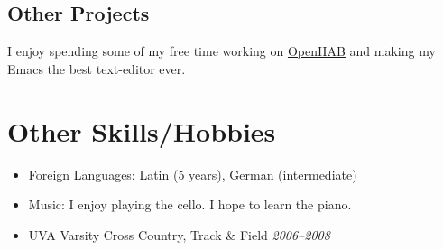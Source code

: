 \documentclass[a4paper,11pt]{article}
\begin{document}
  \subsection*{Other Projects}

  I enjoy spending some of my free time working on
  \href{http://www.openhab.org/}{OpenHAB} and making my Emacs the best
  text-editor ever.



\vskip 4pt
\section*{Other Skills/Hobbies}
\vskip 5pt

  \begin{itemize}
    \item Foreign Languages: Latin (5 years), German (intermediate)
    \item Music: I enjoy playing the cello. I hope to learn the piano.
    \item UVA Varsity Cross Country, Track \& Field \hfill \textit{2006--2008}
  \end{itemize}
\end{document}
